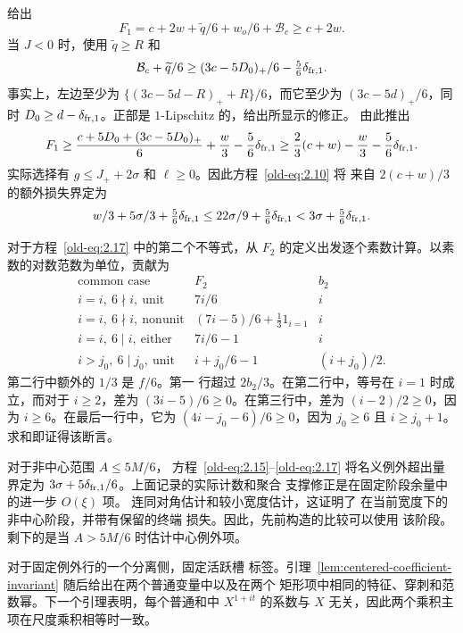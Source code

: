 \documentclass[11pt,a4paper]{article}
\numberwithin{equation}{section}
\numberwithin{figure}{section}
\theoremstyle{definition}
\theoremstyle{remark}
\begin{document}
给出
\[
 F_1=c+2w+\widetilde q/6+w_o/6+\mathcal B_c
       \ge c+2w.
\]
当 \(J<0\) 时，使用 \(\widetilde q\ge R\) 和
\[
 \mathcal B_c+\widetilde q/6
 \ge (3c-5D_0)_+/6-\tfrac56\delta_{{\rm fr},1}.
\]
事实上，左边至少为
\(\{(3c-5d-R)_++R\}/6\)，而它至少为
\((3c-5d)_+/6\)，同时
\(D_0\ge d-\delta_{{\rm fr},1}\)。正部是
\(1\)-Lipschitz 的，给出所显示的修正。
由此推出
\[
 F_1\ge
 \frac{c+5D_0+(3c-5D_0)_+}{6}+\frac w3
       -\frac56\delta_{{\rm fr},1}
 \ge\frac23(c+w)-\frac w3-\frac56\delta_{{\rm fr},1}.
\]
实际选择有 \(g\le J_++2\sigma\) 和
\(\ell\ge0\)。因此方程~\eqref{old-eq:2.10} 将
来自 \(2(c+w)/3\) 的额外损失界定为
\[
 w/3+5\sigma/3+\tfrac56\delta_{{\rm fr},1}
 \le22\sigma/9+\tfrac56\delta_{{\rm fr},1}
 <3\sigma+\tfrac56\delta_{{\rm fr},1}.
\]

对于方程~\eqref{old-eq:2.17} 中的第二个不等式，从 \(F_2\) 的定义出发逐个素数计算。以素数的对数范数为单位，贡献为
\[
 \begin{array}{c|c|c}
 \text{common case}&F_2&b_2\\ \hline
 i=i,\ 6\nmid i,\ \text{unit}&7i/6&i\\
 i=i,\ 6\nmid i,\ \text{nonunit}
       &(7i-5)/6+\tfrac13 1_{i=1}&i\\
 i=i,\ 6\mid i,\ \text{either}&7i/6-1&i\\
 i>j_0,\ 6\mid j_0,\ \text{unit}
       &i+j_0/6-1&(i+j_0)/2 .
 \end{array}
\]
第二行中额外的 \(1/3\) 是 \(f/6\)。第一
行超过 \(2b_2/3\)。在第二行中，等号在
\(i=1\) 时成立，而对于 \(i\ge2\)，差为
\((3i-5)/6\ge0\)。在第三行中，差为
\((i-2)/2\ge0\)，因为 \(i\ge6\)。在最后一行中，它为
\((4i-j_0-6)/6\ge0\)，因为 \(j_0\ge6\) 且
\(i\ge j_0+1\)。求和即证得该断言。

对于非中心范围 \(A\le5M/6\)，
方程~\eqref{old-eq:2.15}--\eqref{old-eq:2.17}
将名义例外超出量界定为
\(3\sigma+5\delta_{{\rm fr},1}/6\)。上面记录的实际计数和聚合
支撑修正是在固定阶段余量中的进一步 \(O(\xi)\) 项。
连同对角估计和较小宽度估计，这证明了
在当前宽度下的非中心阶段，并带有保留的终端
损失。因此，先前构造的比较可以使用
该阶段。剩下的是当 \(A>5M/6\) 时估计中心例外项。

对于固定例外行的一个分离侧，固定活跃槽
标签。引理~\ref{lem:centered-coefficient-invariant} 随后给出在两个普通变量中以及在两个
矩形项中相同的特征、穿刺和范数幂。下一个引理表明，每个普通和中 \(X^{1+it}\)
的系数与 \(X\) 无关，因此两个乘积主项在尺度乘积相等时一致。
\end{document}
